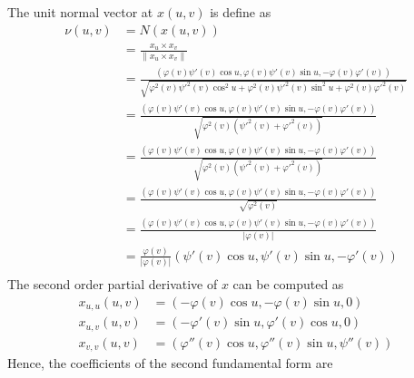 \documentclass[a4paper]{report}
\begin{document}
The unit normal vector at $x(u,v)$ is define as
\begin{align}
\nu(u,v) &= N(x(u,v))\\
&= \frac{x_u \times x_v}{\lVert x_u \times x_v \rVert}\\
&= \frac{\left( \varphi(v) \psi'(v) \cos u, \varphi(v) \psi'(v)\sin u, -\varphi(v) \varphi'(v) \right)}{\sqrt{\varphi^2(v) {\psi'}^2(v) \cos^2 u + \varphi^2(v) {\psi'}^2(v)\sin^2 u + \varphi^2(v) {\varphi'}^2(v)}}\\
&= \frac{\left( \varphi(v) \psi'(v) \cos u, \varphi(v) \psi'(v)\sin u, -\varphi(v) \varphi'(v) \right)}{\sqrt{\varphi^2(v)\left({\psi'}^2(v) + {\varphi'}^2(v)\right)}}\\
&= \frac{\left( \varphi(v) \psi'(v) \cos u, \varphi(v) \psi'(v)\sin u, -\varphi(v) \varphi'(v) \right)}{\sqrt{\varphi^2(v)\left({\psi'}^2(v) + {\varphi'}^2(v)\right)}}\\
&= \frac{\left( \varphi(v) \psi'(v) \cos u, \varphi(v) \psi'(v)\sin u, -\varphi(v) \varphi'(v) \right)}{\sqrt{\varphi^2(v)}}\\
&= \frac{\left( \varphi(v) \psi'(v) \cos u, \varphi(v) \psi'(v)\sin u, -\varphi(v) \varphi'(v) \right)}{\lvert \varphi(v) \rvert}\\
&= \frac{\varphi(v)}{\lvert \varphi(v) \rvert} \left( \psi'(v) \cos u, \psi'(v)\sin u, - \varphi'(v) \right)\\
\end{align}
The second order partial derivative of $x$ can be computed as
\begin{align}
x_{u,u}(u,v) &= \left(- \varphi(v) \cos u, -\varphi(v) \sin u , 0 \right)\\
x_{u,v}(u,v) &= \left(-\varphi'(v)\sin u, \varphi'(v) \cos u ,0  \right)\\
x_{v,v}(u,v) &= \left(\varphi''(v) \cos u, \varphi''(v) \sin u , \psi''(v)\right) 
\end{align}
Hence, the coefficients of the second fundamental form are
\end{document}
